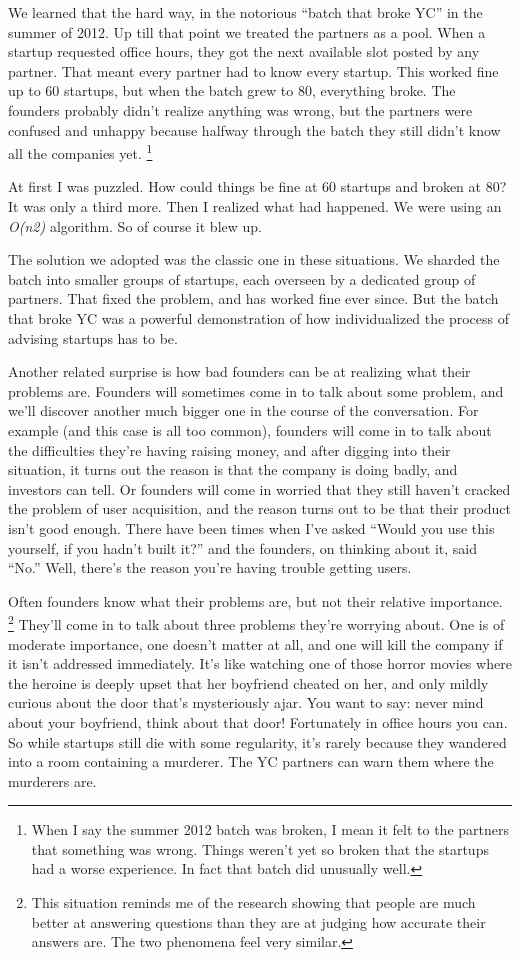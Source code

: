 We learned that the hard way, in the notorious ``batch that broke YC''
in the summer of 2012. Up till that point we treated the partners as a
pool. When a startup requested office hours, they got the next available
slot posted by any partner. That meant every partner had to know every
startup. This worked fine up to 60 startups, but when the batch grew to
80, everything broke. The founders probably didn't realize anything was
wrong, but the partners were confused and unhappy because halfway
through the batch they still didn't know all the companies yet.
\footnote{When I say the summer 2012 batch was broken, I mean it felt to
the partners that something was wrong. Things weren't yet so broken that
the startups had a worse experience. In fact that batch did unusually
well.}

At first I was puzzled. How could things be fine at 60 startups and
broken at 80? It was only a third more. Then I realized what had
happened. We were using an \emph{O(n2)} algorithm. So of course it blew
up.

The solution we adopted was the classic one in these situations. We
sharded the batch into smaller groups of startups, each overseen by a
dedicated group of partners. That fixed the problem, and has worked fine
ever since. But the batch that broke YC was a powerful demonstration of
how individualized the process of advising startups has to be.

Another related surprise is how bad founders can be at realizing what
their problems are. Founders will sometimes come in to talk about some
problem, and we'll discover another much bigger one in the course of the
conversation. For example (and this case is all too common), founders
will come in to talk about the difficulties they're having raising
money, and after digging into their situation, it turns out the reason
is that the company is doing badly, and investors can tell. Or founders
will come in worried that they still haven't cracked the problem of user
acquisition, and the reason turns out to be that their product isn't
good enough. There have been times when I've asked ``Would you use this
yourself, if you hadn't built it?'' and the founders, on thinking about
it, said ``No.'' Well, there's the reason you're having trouble getting
users.

Often founders know what their problems are, but not their relative
importance. \footnote{This situation reminds me of the research showing that people
are much better at answering questions than they are at judging how
accurate their answers are. The two phenomena feel very similar.} They'll come in to talk about three
problems they're worrying about. One is of moderate importance, one
doesn't matter at all, and one will kill the company if it isn't
addressed immediately. It's like watching one of those horror movies
where the heroine is deeply upset that her boyfriend cheated on her, and
only mildly curious about the door that's mysteriously ajar. You want to
say: never mind about your boyfriend, think about that door! Fortunately
in office hours you can. So while startups still die with some
regularity, it's rarely because they wandered into a room containing a
murderer. The YC partners can warn them where the murderers are.

